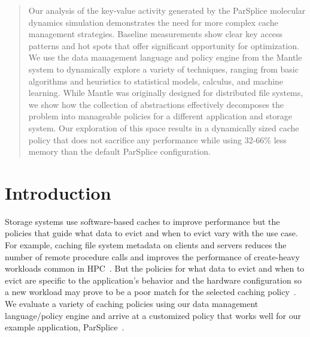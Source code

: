 \begin{abstract}

Our analysis of the key-value activity generated by the ParSplice molecular
dynamics simulation demonstrates the need for more complex cache management
strategies. Baseline measurements show clear key access patterns and hot spots
that offer significant opportunity for optimization. We use the data management
language and policy engine from the Mantle system to dynamically explore a
variety of techniques, ranging from basic algorithms and heuristics to
statistical models, calculus, and machine learning. While Mantle was originally
designed for distributed file systems, we show how the collection of
abstractions effectively decomposes the problem into manageable policies for a
different application and storage system.  Our exploration of this space results in a
dynamically sized cache policy that does not sacrifice any performance while
using 32-66\% less memory than the default ParSplice configuration.

\end{abstract}

\section{Introduction}

Storage systems use software-based caches to improve performance but the
policies that guide what data to evict and when to evict vary with the use
case. For example, caching file system metadata on clients and servers reduces
the number of remote procedure calls and improves the performance of
create-heavy workloads common in HPC~\cite{ren:sc2014-indexfs,
patil:fast2011-giga+, weil:sc2004-dyn-metadata}. But the policies for what data
to evict and when to evict are specific to the application's behavior and the
hardware configuration so a new workload may prove to be a poor match for the
selected caching
policy~\cite{xiao:socc15-shardfs,brandt:msst2003-lh,sevilla:sc15-mantle,
weil:sc2004-dyn-metadata, weil:osdi2006-ceph}. We evaluate a variety of caching
policies using our data management language/policy engine and arrive at a
customized policy that works well for our example application,
ParSplice~\cite{perez:jctc20150parsplice}.

